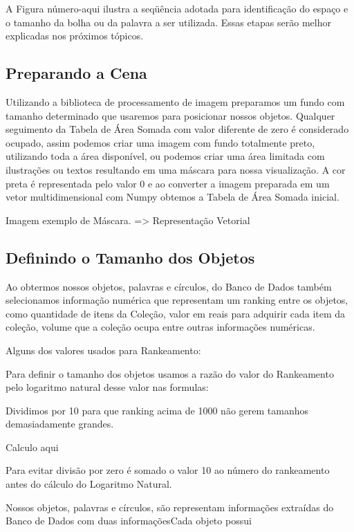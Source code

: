 \documentclass[12pt]{article}
\begin{document}
A Figura número-aqui ilustra a seqüência adotada para identificação do espaço e o tamanho da bolha ou da palavra a ser utilizada. Essas etapas serão melhor explicadas nos próximos tópicos.   

\subsection{Preparando a Cena}

Utilizando a biblioteca de processamento de imagem preparamos um fundo com tamanho determinado que usaremos para posicionar nossos objetos. 
Qualquer seguimento da Tabela de Área Somada com valor diferente de zero é considerado ocupado, assim podemos criar uma imagem com fundo totalmente preto, utilizando toda a área disponível, ou podemos criar uma área limitada com ilustrações ou textos resultando em uma máscara para nossa visualização.
A cor preta é representada pelo valor 0 e ao converter a imagem preparada em um vetor multidimensional com Numpy obtemos a Tabela de Área Somada inicial.


Imagem exemplo de Máscara. => Representação Vetorial


\subsection{Definindo o Tamanho dos Objetos}

Ao obtermos nossos objetos, palavras e círculos, do Banco de Dados também selecionamos informação numérica que representam um ranking entre os objetos, como quantidade de itens da Coleção, valor em reais para adquirir cada item da coleção, volume que a coleção ocupa entre outras informações numéricas.

Alguns dos valores usados para Rankeamento:


Para definir o tamanho dos objetos usamos a razão do valor do Rankeamento pelo logaritmo natural desse valor nas formulas:

Dividimos por 10 para que ranking acima de 1000 não gerem tamanhos demasiadamente grandes. 

{Calculo aqui}

Para evitar divisão por zero é somado o valor 10 ao número do rankeamento antes do cálculo do Logaritmo Natural.

 


Nossos objetos, palavras e círculos, são representam informações extraídas do Banco de Dados com duas informaçõesCada objeto possui 
\end{document}
